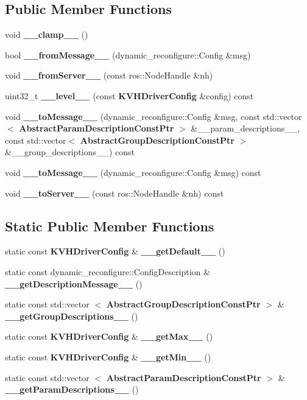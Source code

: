 \subsection*{\-Public \-Member \-Functions}
\begin{DoxyCompactItemize}
\item 
void {\bf \-\_\-\-\_\-clamp\-\_\-\-\_\-} ()
\item 
bool {\bf \-\_\-\-\_\-from\-Message\-\_\-\-\_\-} (dynamic\-\_\-reconfigure\-::\-Config \&msg)
\item 
void {\bf \-\_\-\-\_\-from\-Server\-\_\-\-\_\-} (const ros\-::\-Node\-Handle \&nh)
\item 
uint32\-\_\-t {\bf \-\_\-\-\_\-level\-\_\-\-\_\-} (const {\bf \-K\-V\-H\-Driver\-Config} \&config) const 
\item 
void {\bf \-\_\-\-\_\-to\-Message\-\_\-\-\_\-} (dynamic\-\_\-reconfigure\-::\-Config \&msg, const std\-::vector$<$ {\bf \-Abstract\-Param\-Description\-Const\-Ptr} $>$ \&\-\_\-\-\_\-param\-\_\-descriptions\-\_\-\-\_\-, const std\-::vector$<$ {\bf \-Abstract\-Group\-Description\-Const\-Ptr} $>$ \&\-\_\-\-\_\-group\-\_\-descriptions\-\_\-\-\_\-) const 
\item 
void {\bf \-\_\-\-\_\-to\-Message\-\_\-\-\_\-} (dynamic\-\_\-reconfigure\-::\-Config \&msg) const 
\item 
void {\bf \-\_\-\-\_\-to\-Server\-\_\-\-\_\-} (const ros\-::\-Node\-Handle \&nh) const 
\end{DoxyCompactItemize}
\subsection*{\-Static \-Public \-Member \-Functions}
\begin{DoxyCompactItemize}
\item 
static const {\bf \-K\-V\-H\-Driver\-Config} \& {\bf \-\_\-\-\_\-get\-Default\-\_\-\-\_\-} ()
\item 
static const \*
dynamic\-\_\-reconfigure\-::\-Config\-Description \& {\bf \-\_\-\-\_\-get\-Description\-Message\-\_\-\-\_\-} ()
\item 
static const std\-::vector\*
$<$ {\bf \-Abstract\-Group\-Description\-Const\-Ptr} $>$ \& {\bf \-\_\-\-\_\-get\-Group\-Descriptions\-\_\-\-\_\-} ()
\item 
static const {\bf \-K\-V\-H\-Driver\-Config} \& {\bf \-\_\-\-\_\-get\-Max\-\_\-\-\_\-} ()
\item 
static const {\bf \-K\-V\-H\-Driver\-Config} \& {\bf \-\_\-\-\_\-get\-Min\-\_\-\-\_\-} ()
\item 
static const std\-::vector\*
$<$ {\bf \-Abstract\-Param\-Description\-Const\-Ptr} $>$ \& {\bf \-\_\-\-\_\-get\-Param\-Descriptions\-\_\-\-\_\-} ()
\end{DoxyCompactItemize}
